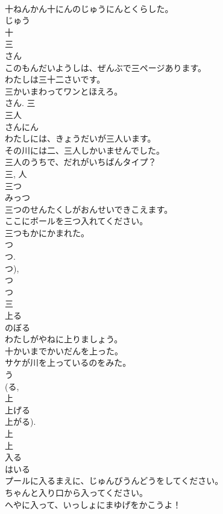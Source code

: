 \documentclass[8pt]{extreport}
\begin{document}
\begin{CJK}{UTF8}{min}
\\	十ねんかん十にんのじゅうにんとくらした。	
\\	じゅう 
\\	十	
\\	三	
\\	さん	
\\	このもんだいようしは、ぜんぶで三ページあります。	
\\	わたしは三十二さいです。	
\\	三かいまわってワンとほえろ。	
\\	さん.	三	
\\	三人	
\\	さんにん	
\\	わたしには、きょうだいが三人います。	
\\	その川には二、三人しかいませんでした。	
\\	三人のうちで、だれがいちばんタイプ？	
\\	三, 人	
\\	三つ	
\\	みっつ	
\\	三つのせんたくしがおんせいできこえます。	
\\	ここにボールを三つ入れてください。	
\\	三つもかにかまれた。	
\\	つ 
\\	つ. 
\\	つ), 
\\	つ 
\\	つ 
\\	三	
\\	上る	
\\	のぼる	
\\	わたしがやねに上りましょう。	
\\	十かいまでかいだんを上った。	
\\	サケが川を上っているのをみた。	
\\	う 
\\	(る, 
\\	上 
\\	上げる 
\\	上がる). 
\\	上 
\\	上	
\\	入る	
\\	はいる	
\\	プールに入るまえに、じゅんびうんどうをしてください。	
\\	ちゃんと入り口から入ってください。	
\\	へやに入って、いっしょにまゆげをかこうよ！	

\end{CJK}
\end{document}
